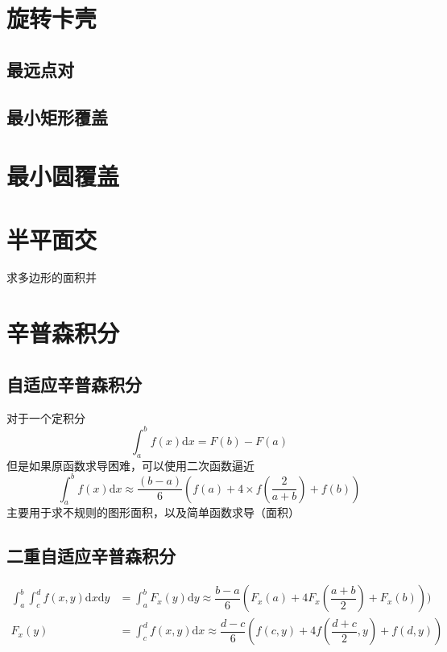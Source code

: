 \documentclass{probook}
\begin{document}
\section{旋转卡壳} 
\subsection{最远点对}

\subsection{最小矩形覆盖} 

\section{最小圆覆盖} 

\section{半平面交}
求多边形的面积并 

\section{辛普森积分} 
\subsection{自适应辛普森积分}
对于一个定积分
$$
\int_{a}^{b} f(x) \mathrm{d}x = F(b) - F(a)
$$
但是如果原函数求导困难，可以使用二次函数逼近
$$
\int_{a}^{b} f(x) \mathrm{d}x \approx \dfrac{(b - a)}{6} (f(a) + 4 \times f(\dfrac{2}{a + b}) + f(b))
$$
主要用于求不规则的图形面积，以及简单函数求导（面积）

\subsection{二重自适应辛普森积分} 
$$
\begin{aligned}
\int_{a}^{b}\int_{c}^{d} f(x, y) \mathrm{d}x\mathrm{d}y &= \int_{a}^{b}F_x(y) \mathrm{d}y \approx \dfrac{b - a}{6} (F_x(a) + 4F_x(\dfrac{a + b}{2}) + F_x(b))) \\
F_x(y) &= \int_{c}^{d} f(x, y) \mathrm{d}x \approx \dfrac{d - c}{6}(f(c, y) + 4f(\dfrac{d + c}{2}, y) + f(d, y))
\end{aligned}
$$

\end{document}
